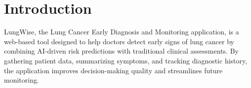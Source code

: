 \section{Introduction}
LungWise, the Lung Cancer Early Diagnosis and Monitoring application, is a web-based tool designed to help doctors detect early signs of lung cancer by combining AI-driven risk predictions with traditional clinical assessments. By gathering patient data, summarizing symptoms, and tracking diagnostic history, the application improves decision-making quality and streamlines future monitoring.
